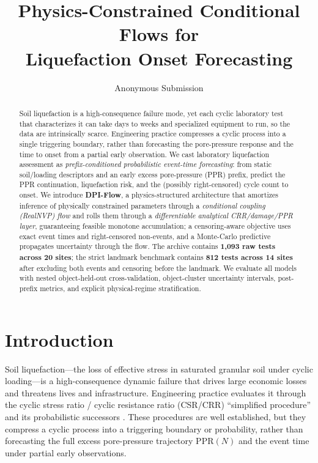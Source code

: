 \documentclass[letterpaper]{article} %
\title{Physics-Constrained Conditional Flows for\\Liquefaction Onset Forecasting}
\author{Anonymous Submission}
\begin{document}
\maketitle

\begin{abstract}
Soil liquefaction is a high-consequence failure mode, yet each cyclic laboratory test that characterizes
it can take days to weeks and specialized equipment to run, so the data are intrinsically scarce.
Engineering practice compresses a cyclic process into a single triggering boundary, rather than
forecasting the pore-pressure response and the time to onset from a partial early observation.
We cast laboratory liquefaction assessment as \emph{prefix-conditioned probabilistic event-time
forecasting}: from static soil/loading descriptors and an early excess pore-pressure (PPR) prefix,
predict the PPR continuation, liquefaction risk, and the (possibly right-censored) cycle count to onset.
We introduce \textbf{DPI-Flow}, a physics-structured architecture that amortizes inference of physically
constrained parameters through a \emph{conditional coupling (RealNVP) flow} and rolls them through a
\emph{differentiable analytical CRR/damage/PPR layer}, guaranteeing feasible monotone accumulation;
a censoring-aware objective uses exact event times and right-censored non-events, and a Monte-Carlo
predictive propagates uncertainty through the flow. The archive contains \textbf{1{,}093 raw tests across
20 sites}; the strict landmark benchmark contains \textbf{812 tests across 14 sites} after excluding both
events and censoring before the landmark. We evaluate all models with nested object-held-out cross-validation,
object-cluster uncertainty intervals, post-prefix metrics, and explicit physical-regime stratification.
\end{abstract}

\section{Introduction}
Soil liquefaction---the loss of effective stress in saturated granular soil under cyclic loading---is a
high-consequence dynamic failure that drives large economic losses and threatens lives and
infrastructure. Engineering practice evaluates it through the cyclic stress ratio / cyclic resistance
ratio (CSR/CRR) ``simplified procedure'' and its probabilistic successors
\citep{seedidriss71,youd01,boulanger16}. These procedures are well established, but they compress a
cyclic process into a triggering boundary or probability, rather than forecasting the full excess
pore-pressure trajectory $\mathrm{PPR}(N)$ and the event time under partial early observations.
\end{document}
